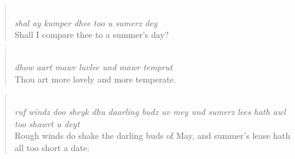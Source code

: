 \begin{quote}\noindent {}\\[1pt]
\textit{shal ay kumper dhee too u sumerz dey}\\[1pt]
Shall I compare thee to a summer's day?
\end{quote}
\begin{quote}\noindent {}\\[1pt]
\textit{dhow aart mawr luvlee und mawr temprut}\\[1pt]
Thou art more lovely and more temperate.
\end{quote}
\begin{quote}\noindent {}\\[1pt]
\textit{ruf windz doo sheyk dhu daarling budz uv mey und sumerz lees hath awl too shawrt u deyt}\\[1pt]
Rough winds do shake the darling buds of May, and summer's lease hath all too short a date.
\end{quote}
